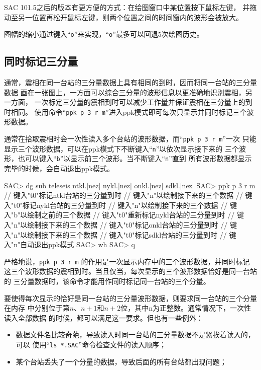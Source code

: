 SAC 101.5之后的版本有更方便的方式：在绘图窗口中某位置按下鼠标左键，
并拖动至另一位置再松开鼠标左键，则两个位置之间的时间窗内的波形会被放大。

图幅的缩小通过键入``\texttt{o}''来实现，``\texttt{o}''最多可以回退5次绘图历史。

\subsection{同时标记三分量}
通常，震相在同一台站的三分量数据上具有相同的到时，因而将同一台站的三分量数据
画在一张图上，一方面可以综合三分量的波形信息以更准确地识别震相，另一方面，
一次标定三分量的震相到时可以减少工作量并保证震相在三分量上的到时相同。
使用命令``\texttt{ppk p 3 r m}''进入ppk模式即可每次只显示并同时标记三个波形数据。

通常在拾取震相时会一次性读入多个台站的波形数据，而``\texttt{ppk p 3 r m}''一次
只能显示三个波形数据，可以在ppk模式下不断键入``\texttt{n}''以依次显示接下来的
三个波形，也可以键入``\texttt{b}''以显示前三个波形。当不断键入``\texttt{n}''直到
所有波形数据都显示完毕的时候，会自动退出ppk模式。

\begin{SACCode}
SAC> dg sub teleseis ntkl.[nez] nykl.[nez] onkl.[nez] sdkl.[nez]
SAC> ppk p 3 r m
// 键入"t0"标记ntkl台站的三分量到时
// 键入"n"以绘制接下来的三个数据
// 键入"t0"标记nykl台站的三分量到时
// 键入"n"以绘制接下来的三个数据
// 键入"b"以绘制之前的三个数据
// 键入"t0"重新标记nykl台站的三分量到时
// 键入"n"以绘制接下来的三个数据
// 键入"t0"标记onkl台站的三分量到时
// 键入"n"以绘制接下来的三个数据
// 键入"t0"标记sdkl台站的三分量到时
// 键入"n"自动退出ppk模式
SAC> wh
SAC> q
\end{SACCode}

严格地说，\texttt{ppk p 3 r m} 的作用是一次显示内存中的三个波形数据，并同时标记
这三个波形数据的震相到时。当且仅当，每次显示的三个波形数据恰好是同一台站的
三分量数据时，该命令才能用作同时标记同一台站的三个分量。

要使得每次显示的恰好是同一台站的三分量波形数据，则要求同一台站的三个分量在内存
中分别位于第$n$、$n+1$和$n+2$位，其中n为正整数。通常情况下，一次性读入全部数据
的时候，都可以满足这一要求。但也有一些例外：
\begin{itemize}
\item 数据文件名比较奇葩，导致读入时同一台站的三分量数据不是紧挨着读入的，可以
    使用``\texttt{ls *.SAC}''命令检查文件的读入顺序；
\item 某个台站丢失了一个分量的数据，导致后面的所有台站都出现问题；
\end{itemize}

